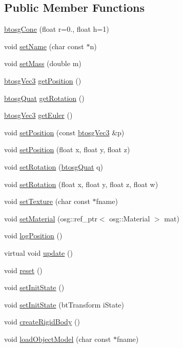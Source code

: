\subsection*{Public Member Functions}
\begin{DoxyCompactItemize}
\item 
\hyperlink{classbtosgCone_a119bf79e2311ba084939d3e25086751c}{btosg\+Cone} (float r=0., float h=1)
\item 
void \hyperlink{classbtosgObject_ab06a1b3f357209214c6440cd5746523e}{set\+Name} (char const $\ast$n)
\item 
void \hyperlink{classbtosgObject_a91da93c82d48b86192f0cbb16054fe57}{set\+Mass} (double m)
\item 
\hyperlink{classbtosgVec3}{btosg\+Vec3} \hyperlink{classbtosgObject_a3dadd5da8f2a312e44a039446b93d4cd}{get\+Position} ()
\item 
\hyperlink{classbtosgQuat}{btosg\+Quat} \hyperlink{classbtosgObject_a3b825999ad3a51bde743d4085ff19dae}{get\+Rotation} ()
\item 
\hyperlink{classbtosgVec3}{btosg\+Vec3} \hyperlink{classbtosgObject_a2019ec63bde02b72600450c7c985e77a}{get\+Euler} ()
\item 
void \hyperlink{classbtosgObject_ace6b51040b7ddce90818174200cc6074}{set\+Position} (const \hyperlink{classbtosgVec3}{btosg\+Vec3} \&p)
\item 
void \hyperlink{classbtosgObject_adb9f2cff0faf66dc252cd7c97b11ac84}{set\+Position} (float x, float y, float z)
\item 
void \hyperlink{classbtosgObject_a6365748d5506bb9da31907c9988071fa}{set\+Rotation} (\hyperlink{classbtosgQuat}{btosg\+Quat} q)
\item 
void \hyperlink{classbtosgObject_a4d21ca59b944fd26644db35d3e9ba67a}{set\+Rotation} (float x, float y, float z, float w)
\item 
void \hyperlink{classbtosgObject_aff54acbc7c66811efb0cf2838107a241}{set\+Texture} (char const $\ast$fname)
\item 
void \hyperlink{classbtosgObject_a6ab7b9e0553dab398b980637788b56a8}{set\+Material} (osg\+::ref\+\_\+ptr$<$ osg\+::\+Material $>$ mat)
\item 
void \hyperlink{classbtosgObject_acfd70fa6477c80fd7f29ad7ab9f4f067}{log\+Position} ()
\item 
virtual void \hyperlink{classbtosgObject_a342917817dfde62554f83da8e0d5110b}{update} ()
\item 
void \hyperlink{classbtosgObject_a93983f9180dd0672f8779cf2baa78580}{reset} ()
\item 
void \hyperlink{classbtosgObject_ad1508a0ce28cfac83e5f0ff6245f91b5}{set\+Init\+State} ()
\item 
void \hyperlink{classbtosgObject_a6ceb08e59ee95acaaef389ee198d2b56}{set\+Init\+State} (bt\+Transform i\+State)
\item 
void \hyperlink{classbtosgObject_a029dbe9134fa94e7355799f67fb2cd6d}{create\+Rigid\+Body} ()
\item 
void \hyperlink{classbtosgObject_a91838b8235579da178fcc06e6d3d47f3}{load\+Object\+Model} (char const $\ast$fname)
\end{DoxyCompactItemize}
